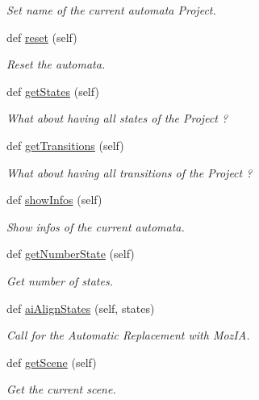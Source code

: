 \begin{DoxyCompactItemize}
\begin{DoxyCompactList}\small\item\em Set name of the current automata Project. \end{DoxyCompactList}\item 
\mbox{\label{classDrawer_1_1Drawer_ae82fe427271c51c470cbe1ec9dfd17ce}} 
def \mbox{\hyperlink{classDrawer_1_1Drawer_ae82fe427271c51c470cbe1ec9dfd17ce}{reset}} (self)
\begin{DoxyCompactList}\small\item\em Reset the automata. \end{DoxyCompactList}\item 
def \mbox{\hyperlink{classDrawer_1_1Drawer_a80e742a1ca3ac0eb44f8f0ce5168a135}{get\+States}} (self)
\begin{DoxyCompactList}\small\item\em What about having all states of the Project ? \end{DoxyCompactList}\item 
def \mbox{\hyperlink{classDrawer_1_1Drawer_a84e894687f80eef391d57a1aeb14ad74}{get\+Transitions}} (self)
\begin{DoxyCompactList}\small\item\em What about having all transitions of the Project ? \end{DoxyCompactList}\item 
\mbox{\label{classDrawer_1_1Drawer_a119134dd7e54c088d8fdcf33efa22cd1}} 
def \mbox{\hyperlink{classDrawer_1_1Drawer_a119134dd7e54c088d8fdcf33efa22cd1}{show\+Infos}} (self)
\begin{DoxyCompactList}\small\item\em Show infos of the current automata. \end{DoxyCompactList}\item 
\mbox{\label{classDrawer_1_1Drawer_a74b2a2a79aec07a42f1e3ef3b517e82a}} 
def \mbox{\hyperlink{classDrawer_1_1Drawer_a74b2a2a79aec07a42f1e3ef3b517e82a}{get\+Number\+State}} (self)
\begin{DoxyCompactList}\small\item\em Get number of states. \end{DoxyCompactList}\item 
def \mbox{\hyperlink{classDrawer_1_1Drawer_a25193cdc8d6c08da73bac711e1bbdd8a}{ai\+Align\+States}} (self, states)
\begin{DoxyCompactList}\small\item\em Call for the Automatic Replacement with Moz\+IA. \end{DoxyCompactList}\item 
def \mbox{\hyperlink{classDrawer_1_1Drawer_a6d0baf0bf280f0cbfc42e7fc8d57cadb}{get\+Scene}} (self)
\begin{DoxyCompactList}\small\item\em Get the current scene. \end{DoxyCompactList}\end{DoxyCompactItemize}
